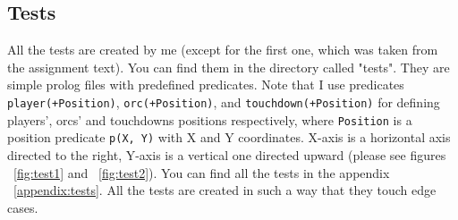 \documentclass{article}
\begin{document}
\subsection{Tests}
All the tests are created by me (except for the first one, which was taken from the assignment text). You can find them in the directory called "tests". They are simple prolog files with predefined predicates. Note that I use predicates \texttt{player(+Position)}, \texttt{orc(+Position)}, and \texttt{touchdown(+Position)} for defining players', orcs' and touchdowns positions respectively, where \texttt{Position} is a position predicate \texttt{p(X, Y)} with X and Y coordinates. X-axis is a horizontal axis directed to the right, Y-axis is a vertical one directed upward (please see figures ~\ref{fig:test1} and ~\ref{fig:test2}). You can find all the tests in the appendix ~\ref{appendix:tests}. All the tests are created in such a way that they touch edge cases.

\end{document}
